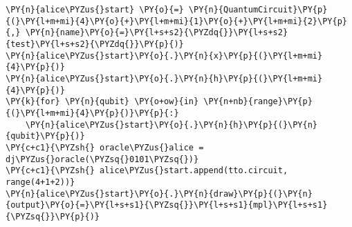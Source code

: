     \begin{tcolorbox}[breakable, size=fbox, boxrule=1pt, pad at break*=1mm,colback=cellbackground, colframe=cellborder]
\begin{Verbatim}[commandchars=\\\{\}]
\PY{n}{alice\PYZus{}start} \PY{o}{=} \PY{n}{QuantumCircuit}\PY{p}{(}\PY{l+m+mi}{4}\PY{o}{+}\PY{l+m+mi}{1}\PY{o}{+}\PY{l+m+mi}{2}\PY{p}{,} \PY{n}{name}\PY{o}{=}\PY{l+s+s2}{\PYZdq{}}\PY{l+s+s2}{test}\PY{l+s+s2}{\PYZdq{}}\PY{p}{)}
\PY{n}{alice\PYZus{}start}\PY{o}{.}\PY{n}{x}\PY{p}{(}\PY{l+m+mi}{4}\PY{p}{)}
\PY{n}{alice\PYZus{}start}\PY{o}{.}\PY{n}{h}\PY{p}{(}\PY{l+m+mi}{4}\PY{p}{)}
\PY{k}{for} \PY{n}{qubit} \PY{o+ow}{in} \PY{n+nb}{range}\PY{p}{(}\PY{l+m+mi}{4}\PY{p}{)}\PY{p}{:}
    \PY{n}{alice\PYZus{}start}\PY{o}{.}\PY{n}{h}\PY{p}{(}\PY{n}{qubit}\PY{p}{)}
\PY{c+c1}{\PYZsh{} oracle\PYZus{}alice = dj\PYZus{}oracle(\PYZsq{}0101\PYZsq{})}
\PY{c+c1}{\PYZsh{} alice\PYZus{}start.append(tto.circuit, range(4+1+2))}
\PY{n}{alice\PYZus{}start}\PY{o}{.}\PY{n}{draw}\PY{p}{(}\PY{n}{output}\PY{o}{=}\PY{l+s+s1}{\PYZsq{}}\PY{l+s+s1}{mpl}\PY{l+s+s1}{\PYZsq{}}\PY{p}{)}
\end{Verbatim}
\end{tcolorbox}
 
            
    
    \begin{center}
    \end{center}
    { \hspace*{\fill} \\}
    

